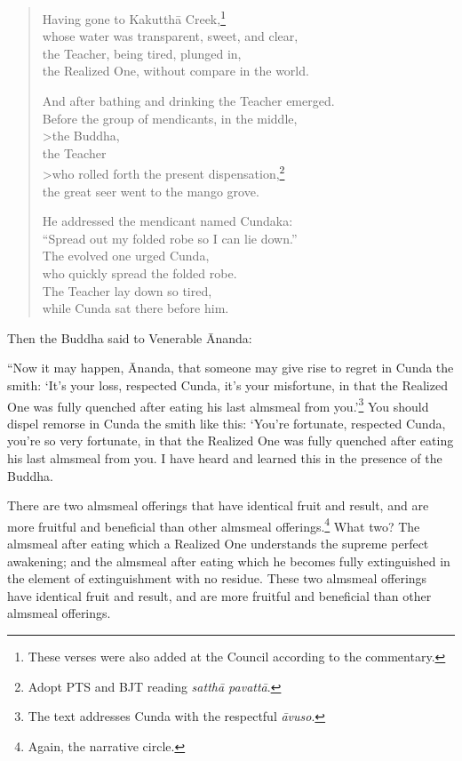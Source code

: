 \documentclass[12pt,openany]{book}%
\begin{document}
\begin{verse}%
Having gone to \textsanskrit{Kakutthā} Creek,\footnote{These verses were also added at the Council according to the commentary. } \\
whose water was transparent, sweet, and clear, \\
the Teacher, being tired, plunged in, \\
the Realized One, without compare in the world. 

And after bathing and drinking the Teacher emerged. \\
Before the group of mendicants, in the middle, \\>the Buddha, \\
the Teacher \\>who rolled forth the present dispensation,\footnote{Adopt PTS and BJT reading \textit{\textsanskrit{satthā} \textsanskrit{pavattā}}. } \\
the great seer went to the mango grove. 

He addressed the mendicant named Cundaka: \\
“Spread out my folded robe so I can lie down.” \\
The evolved one urged Cunda, \\
who quickly spread the folded robe. \\
The Teacher lay down so tired, \\
while Cunda sat there before him. 

%
\end{verse}

Then the Buddha said to Venerable Ānanda: 

“Now it may happen, Ānanda, that someone may give rise to regret in Cunda the smith: ‘It’s your loss, respected Cunda, it’s your misfortune, in that the Realized One was fully quenched after eating his last almsmeal from you.’\footnote{The text addresses Cunda with the respectful \textit{\textsanskrit{āvuso}}. } You should dispel remorse in Cunda the smith like this: ‘You’re fortunate, respected Cunda, you’re so very fortunate, in that the Realized One was fully quenched after eating his last almsmeal from you. I have heard and learned this in the presence of the Buddha. 

There are two almsmeal offerings that have identical fruit and result, and are more fruitful and beneficial than other almsmeal offerings.\footnote{Again, the narrative circle. } What two? The almsmeal after eating which a Realized One understands the supreme perfect awakening; and the almsmeal after eating which he becomes fully extinguished in the element of extinguishment with no residue. These two almsmeal offerings have identical fruit and result, and are more fruitful and beneficial than other almsmeal offerings. 
\end{document}
